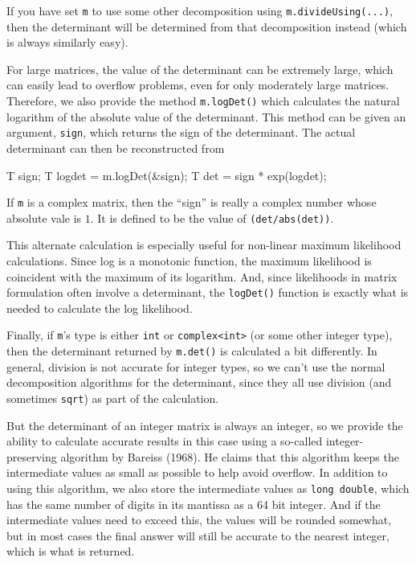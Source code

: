 \documentclass[twoside,letterpaper,11pt]{article}
\renewcommand{\tt}[1]{{\lstinline {#1}}}
\begin{document}
If you have set \tt{m} to use some other decomposition using 
\tt{m.divideUsing(...)},
then the determinant will be determined from that decomposition instead 
(which is always similarly easy).

For large matrices, the value of the determinant can be extremely large, which can easily
lead to overflow problems, even for only moderately large matrices.  Therefore, we
also provide the method \tt{m.logDet()} which calculates the natural logarithm of the
absolute value of the determinant.  This method can be given an argument, \tt{sign},
which returns the sign of the determinant.  The actual determinant can then be 
reconstructed from 
\begin{tmvcode}
T sign;
T logdet = m.logDet(&sign);
T det = sign * exp(logdet);
\end{tmvcode}
If \tt{m} is a complex matrix, then the ``sign'' is really a complex number whose 
absolute vale is $1$. It is defined to be the value of \tt{(det/abs(det))}.

This alternate calculation is especially useful for non-linear maximum likelihood
calculations.  Since log is a monotonic function, the maximum likelihood is coincident
with the maximum of its logarithm.  And, since likelihoods in matrix formulation
often involve a determinant,
the \tt{logDet()} function is exactly what is needed to calculate the log likelihood.

Finally, if \tt{m}'s type is either \tt{int} or \tt{complex<int>} (or some other integer type),
then the determinant returned by \tt{m.det()} is calculated a bit differently.  In general, division is not accurate
for integer types, so we can't use the normal decomposition algorithms for the determinant,
since they all use division (and sometimes \tt{sqrt}) as part of the calculation.  

But the determinant of an integer matrix
is always an integer, so we provide the ability to calculate accurate results in this case 
using a so-called integer-preserving algorithm by Bareiss (1968).  He claims that this
algorithm keeps the intermediate values as small as possible to help avoid overflow.
In addition to using this algorithm, we also store the intermediate values as \tt{long double},
which has the same number of digits in its mantissa as a 64 bit integer.  And if the intermediate
values need to exceed this, the values will be rounded somewhat, but in most cases the 
final answer will still be accurate to the nearest integer, which is what is returned.
\end{document}
